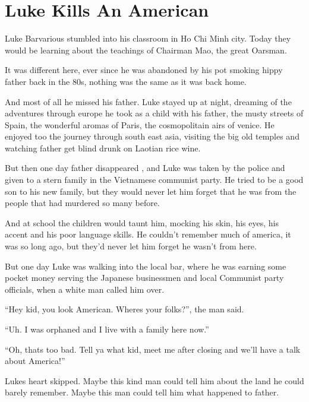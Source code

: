 \chapter{Luke Kills An American}


Luke Barvarious stumbled into his classroom in Ho Chi Minh city.
Today they would be learning about the teachings of Chairman Mao,
the great Oarsman.



It was different here, ever since he was abandoned by his pot
smoking hippy father back in the 80s, nothing was the same as it
was back home.



And most of all he missed his father. Luke stayed up at night,
dreaming of the adventures through europe he took as a child with
his father, the musty streets of Spain, the wonderful aromas of
Paris, the cosmopolitain airs of venice. He enjoyed too the journey
through south east asia, visiting the big old temples and watching
father get blind drunk on Laotian rice wine.



But then one day father disappeared , and Luke was taken by the
police and given to a stern family in the Vietnamese communist
party. He tried to be a good son to his new family, but they would
never let him forget that he was from the people that had murdered
so many before.



And at school the children would taunt him, mocking his skin, his
eyes, his accent and his poor language skills. He couldn't remember
much of america, it was so long ago, but they'd never let him
forget he wasn't from here.



But one day Luke was walking into the local bar, where he was
earning some pocket money serving the Japanese businessmen and
local Communist party officials, when a white man called him
over.



``Hey kid, you look American. Wheres your folks?'', the man
said.



``Uh. I was orphaned and I live with a family here now.''



``Oh, thats too bad. Tell ya what kid, meet me after closing and
we'll have a talk about America!''



Lukes heart skipped. Maybe this kind man could tell him about the
land he could barely remember. Maybe this man could tell him what
happened to father.



